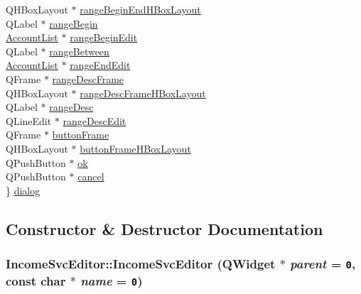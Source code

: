 \begin{CompactItemize}
\begin{tabbing}
\>QHBoxLayout $\ast$ \hyperlink{classIncomeSvcEditor_r19}{rangeBeginEndHBoxLayout}\\
\>QLabel $\ast$ \hyperlink{classIncomeSvcEditor_r20}{rangeBegin}\\
\>\hyperlink{classAccountList}{AccountList} $\ast$ \hyperlink{classIncomeSvcEditor_r21}{rangeBeginEdit}\\
\>QLabel $\ast$ \hyperlink{classIncomeSvcEditor_r22}{rangeBetween}\\
\>\hyperlink{classAccountList}{AccountList} $\ast$ \hyperlink{classIncomeSvcEditor_r23}{rangeEndEdit}\\
\>QFrame $\ast$ \hyperlink{classIncomeSvcEditor_r24}{rangeDescFrame}\\
\>QHBoxLayout $\ast$ \hyperlink{classIncomeSvcEditor_r25}{rangeDescFrameHBoxLayout}\\
\>QLabel $\ast$ \hyperlink{classIncomeSvcEditor_r26}{rangeDesc}\\
\>QLineEdit $\ast$ \hyperlink{classIncomeSvcEditor_r27}{rangeDescEdit}\\
\>QFrame $\ast$ \hyperlink{classIncomeSvcEditor_r28}{buttonFrame}\\
\>QHBoxLayout $\ast$ \hyperlink{classIncomeSvcEditor_r29}{buttonFrameHBoxLayout}\\
\>QPushButton $\ast$ \hyperlink{classIncomeSvcEditor_r30}{ok}\\
\>QPushButton $\ast$ \hyperlink{classIncomeSvcEditor_r31}{cancel}\\
\} \hyperlink{classIncomeSvcEditor_r32}{dialog}\\

\end{tabbing}\end{CompactItemize}


\subsection{Constructor \& Destructor Documentation}
\hypertarget{classIncomeSvcEditor_a0}{
\subsubsection[IncomeSvcEditor]{\setlength{\rightskip}{0pt plus 5cm}Income\-Svc\-Editor::Income\-Svc\-Editor (QWidget $\ast$ {\em parent} = {\tt 0}, const char $\ast$ {\em name} = {\tt 0})}}
\label{classIncomeSvcEditor_a0}


